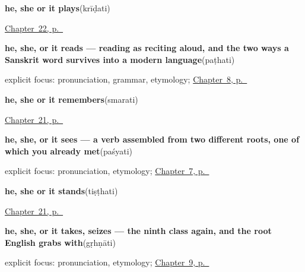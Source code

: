\noindent\begin{minipage}[t]{\linewidth}
\raggedright
\textbf{he, she or it plays}\enspace\emph{}\enspace(krīḍati)\par
\footnotesize \hyperref[ch:sa-verbs-of-mind]{Chapter~22, p.~\pageref*{ch:sa-verbs-of-mind}}
\end{minipage}\par\smallskip

\noindent\begin{minipage}[t]{\linewidth}
\raggedright
\textbf{he, she, or it reads — reading as reciting aloud, and the two ways a Sanskrit word survives into a modern language}\enspace\emph{}\enspace(paṭhati)\par
\footnotesize explicit focus: pronunciation, grammar, etymology; \hyperref[ch:sa-mind-verbs]{Chapter~8, p.~\pageref*{ch:sa-mind-verbs}}
\end{minipage}\par\smallskip

\noindent\begin{minipage}[t]{\linewidth}
\raggedright
\textbf{he, she or it remembers}\enspace\emph{}\enspace(smarati)\par
\footnotesize \hyperref[ch:sa-more-verbs]{Chapter~21, p.~\pageref*{ch:sa-more-verbs}}
\end{minipage}\par\smallskip

\noindent\begin{minipage}[t]{\linewidth}
\raggedright
\textbf{he, she, or it sees — a verb assembled from two different roots, one of which you already met}\enspace\emph{}\enspace(paśyati)\par
\footnotesize explicit focus: pronunciation, etymology; \hyperref[ch:sa-core-verbs]{Chapter~7, p.~\pageref*{ch:sa-core-verbs}}
\end{minipage}\par\smallskip

\noindent\begin{minipage}[t]{\linewidth}
\raggedright
\textbf{he, she or it stands}\enspace\emph{}\enspace(tiṣṭhati)\par
\footnotesize \hyperref[ch:sa-more-verbs]{Chapter~21, p.~\pageref*{ch:sa-more-verbs}}
\end{minipage}\par\smallskip

\noindent\begin{minipage}[t]{\linewidth}
\raggedright
\textbf{he, she, or it takes, seizes — the ninth class again, and the root English grabs with}\enspace\emph{}\enspace(gṛhṇāti)\par
\footnotesize explicit focus: pronunciation, etymology; \hyperref[ch:sa-doing-verbs]{Chapter~9, p.~\pageref*{ch:sa-doing-verbs}}
\end{minipage}\par\smallskip

